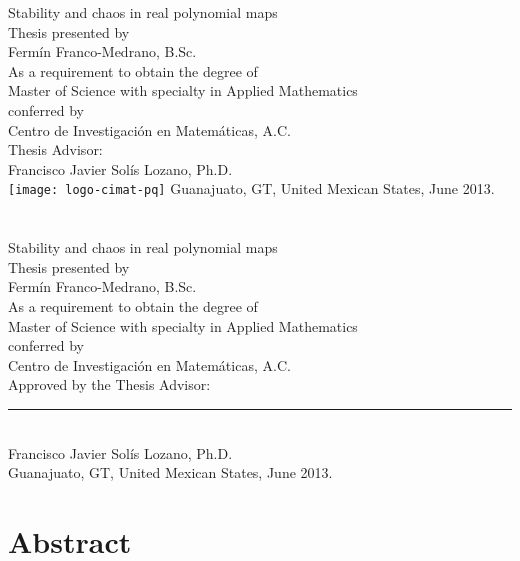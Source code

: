 \documentclass[10pt,twoside,titlepage]{book}
\numberwithin{equation}{chapter}
\numberwithin{figure}{chapter}
\numberwithin{table}{chapter}
\theoremstyle{plain}%
\theoremstyle{definition}
\theoremstyle{remark}
\begin{document}
\frontmatter
\begin{titlepage}
	\centering
	\huge
	Stability and chaos in real polynomial maps\\
	\bigskip
	\normalsize
	Thesis presented by\\
	\smallskip
	\Large
	Ferm\'in Franco-Medrano, B.Sc.\\
	\medskip
	\normalsize
	As a requirement to obtain the degree of\\
	\smallskip
	\large
	Master of Science with specialty in Applied Mathematics\\
	\medskip
	\normalsize
	conferred by\\
	\large
	Centro de Investigaci\'on en Matem\'aticas, A.C.\\
	\medskip
	\normalsize
	Thesis Advisor:\\
	\large
	\medskip
	Francisco Javier Sol\'is Lozano, Ph.D.\\
	\vfill
	\texttt{[image: logo-cimat-pq]}
	\vfill
	\large
	Guanajuato, GT, United Mexican States, June 2013.
\end{titlepage}

\chapter*{}
{\centering
	\huge
	Stability and chaos in real polynomial maps\\
	\bigskip
	\normalsize
	Thesis presented by\\
	\smallskip
	\Large
	Ferm\'in Franco-Medrano, B.Sc.\\
	\medskip
	\normalsize
	As a requirement to obtain the degree of\\
	\smallskip
	\large
	Master of Science with specialty in Applied Mathematics\\
	\medskip
	\normalsize
	conferred by\\
	\large
	Centro de Investigaci\'on en Matem\'aticas, A.C.\\
	\vfill
	\normalsize
	Approved by the Thesis Advisor:\\
	\vfill
	\rule{6.5 cm}{1 pt}\\
	\large
	Francisco Javier Sol\'is Lozano, Ph.D.\\
	\vfill
	\large
	Guanajuato, GT, United Mexican States, June 2013.\\
}
\chapter*{Abstract}
\end{document}
